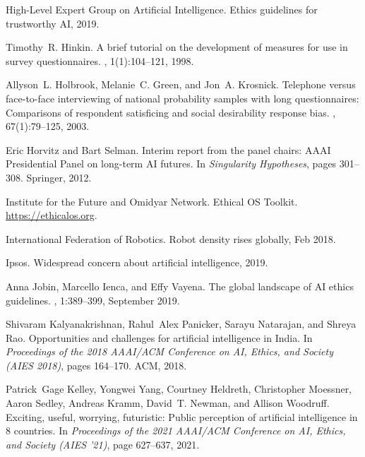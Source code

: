 \documentclass[11pt]{article} %
\begin{document}
\begin{thebibliography}{10}
{High-Level Expert Group on Artificial Intelligence}.
\newblock Ethics guidelines for trustworthy {AI}, 2019.

Timothy~R. Hinkin.
\newblock A brief tutorial on the development of measures for use in survey
  questionnaires.
, 1(1):104--121, 1998.

Allyson~L. Holbrook, Melanie~C. Green, and Jon~A. Krosnick.
\newblock Telephone versus face-to-face interviewing of national probability
  samples with long questionnaires: Comparisons of respondent satisficing and
  social desirability response bias.
, 67(1):79--125, 2003.

Eric Horvitz and Bart Selman.
\newblock Interim report from the panel chairs: {AAAI} {P}residential {P}anel
  on long-term {AI} futures.
\newblock In {\em Singularity Hypotheses}, pages 301--308. Springer, 2012.

{Institute for the Future} and {Omidyar Network}.
\newblock Ethical {OS} {T}oolkit.
\newblock \url{https://ethicalos.org}.

{International Federation of Robotics}.
\newblock Robot density rises globally, Feb 2018.

Ipsos.
\newblock Widespread concern about artificial intelligence, 2019.

Anna Jobin, Marcello Ienca, and Effy Vayena.
\newblock The global landscape of {AI} ethics guidelines.
, 1:389--399, September 2019.

Shivaram Kalyanakrishnan, Rahul~Alex Panicker, Sarayu Natarajan, and Shreya
  Rao.
\newblock Opportunities and challenges for artificial intelligence in {I}ndia.
\newblock In {\em Proceedings of the 2018 AAAI/ACM Conference on AI, Ethics,
  and Society (AIES 2018)}, pages 164--170. ACM, 2018.

Patrick~Gage Kelley, Yongwei Yang, Courtney Heldreth, Christopher Moessner,
  Aaron Sedley, Andreas Kramm, David~T. Newman, and Allison Woodruff.
\newblock Exciting, useful, worrying, futuristic: Public perception of
  artificial intelligence in 8 countries.
\newblock In {\em Proceedings of the 2021 AAAI/ACM Conference on AI, Ethics,
  and Society (AIES '21)}, page 627–637, 2021.


\end{thebibliography}
\end{document}
